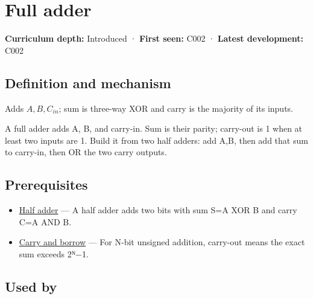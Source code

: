 \hypertarget{appendix-d1a5b1e520c2}{}\label{referencestart:appendix-d1a5b1e520c2}
\section{Full adder}\label{appendix-d1a5b1e520c2-full-adder}

\hypertarget{appendix-d1a5b1e520c2-full-adder}{}

\textbf{Curriculum depth:} Introduced · \textbf{First seen:} C002 · \textbf{Latest development:} C002

\begin{allmightroledefinition}

\subsection{Definition and mechanism}\label{appendix-d1a5b1e520c2-definition-and-mechanism}

\hypertarget{appendix-d1a5b1e520c2-definition-and-mechanism}{}

Adds \(A,B,C_{in}\); sum is three-way XOR and carry is the majority of its inputs.

\end{allmightroledefinition}

A full adder adds A, B, and carry-in. Sum is their parity; carry-out is 1 when at least two inputs are 1. Build it from two half adders: add A,B, then add that sum to carry-in, then OR the two carry outputs.

\subsection{Prerequisites}\label{appendix-d1a5b1e520c2-prerequisites}

\hypertarget{appendix-d1a5b1e520c2-prerequisites}{}

\begin{itemize}
\tightlist
\item
  \hyperref[appendix-1652d27a8e90]{Half adder} --- A half adder adds two bits with sum S=A XOR B and carry C=A AND B.
\item
  \hyperref[appendix-d52d5f78ffd1]{Carry and borrow} --- For N-bit unsigned addition, carry-out means the exact sum exceeds 2ᴺ−1.
\end{itemize}

\subsection{Used by}\label{appendix-d1a5b1e520c2-used-by}


